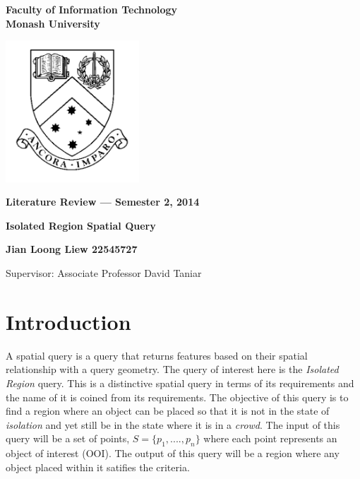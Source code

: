 \documentclass[a4paper,11pt]{article}
\begin{document}
\thispagestyle{empty} %
\renewcommand{\thepage}{\roman{page}}

\begin{spacing}{1.5}
\begin{center}
{\Large \bfseries
Faculty of Information Technology\\
Monash University}

\vspace*{30mm}

\includegraphics[width=5cm]{MonashCrest}

\vspace*{15mm}

{\large \bfseries
Literature Review --- Semester 2, 2014
}

\vspace*{10mm}

{\LARGE \bfseries
Isolated Region Spatial Query
}

\vspace*{20mm}

{\large \bfseries
Jian Loong Liew 22545727

\vspace*{20mm}

Supervisor: Associate Professor David Taniar
}

\end{center}
\end{spacing}

\newpage

\tableofcontents

\newpage
\setcounter{page}{1}
\renewcommand{\thepage}{\arabic{page}}

\section{Introduction} 

A spatial query is a query that returns features based on their spatial relationship with a query geometry. The query of interest here is the \textit{Isolated Region} query. This is a distinctive spatial query in terms of its requirements and the name of it is coined from its requirements. The objective of this query is to find a region where an object can be placed so that it is not in the state of \textit{isolation} and yet still be in the state where it is in a \textit{crowd}. The input of this query will be a set of points, $S = \{p_1,....,p_n\}$ where each point represents an object of interest (OOI). The output of this query will be a region where any object placed within it satifies the criteria. 
\end{document}
